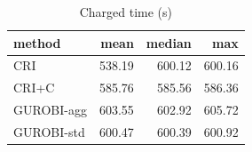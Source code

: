 \begin{table}[htbp]
\centering
\small
\caption{Charged time (s)}
\label{tab:E3x_long_runs_xlarge_b600_time}
\begin{tabular}{lrrr}
\toprule
method & mean & median & max \\
\midrule
CRI & 538.19 & 600.12 & 600.16 \\
CRI+C & 585.76 & 585.56 & 586.36 \\
GUROBI-agg & 603.55 & 602.92 & 605.72 \\
GUROBI-std & 600.47 & 600.39 & 600.92 \\
\bottomrule
\end{tabular}
\end{table}
